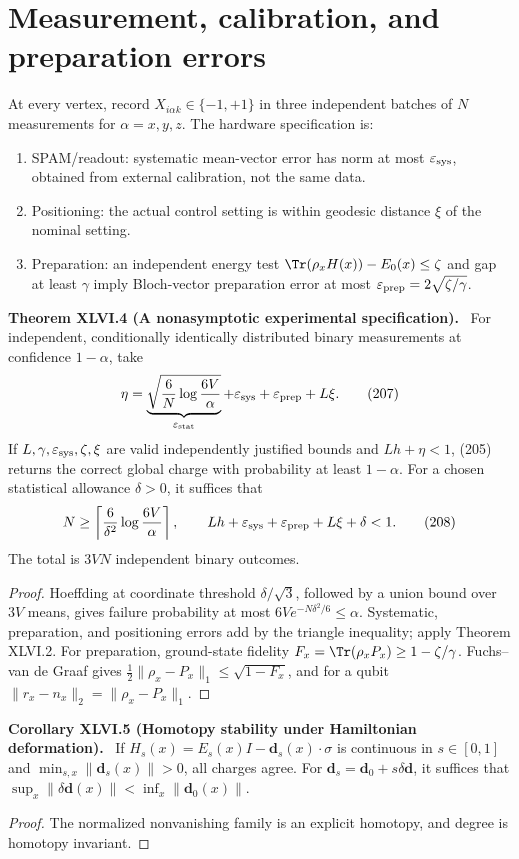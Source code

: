 \documentclass[11pt,a4paper,oneside]{book}
\newcommand{\statement}[3]{\par\medskip\noindent\textbf{#1 #2 (#3).}\ }
\begin{document}
\section{Measurement, calibration, and preparation errors}
At every vertex, record $X_{i\alpha k}\in\{-1,+1\}$ in three independent batches of $N$ measurements for $\alpha=x,y,z$. The hardware specification is:
\begin{enumerate}
\item SPAM/readout: systematic mean-vector error has norm at most $\varepsilon_{\rm sys}$, obtained from external calibration, not the same data.
\item Positioning: the actual control setting is within geodesic distance $\xi$ of the nominal setting.
\item Preparation: an independent energy test $\Tr(\rho_xH(x))-E_0(x)\le\zeta$ and gap at least $\gamma$ imply Bloch-vector preparation error at most $\varepsilon_{\rm prep}=2\sqrt{\zeta/\gamma}$.
\end{enumerate}
\statement{Theorem}{XLVI.4}{A nonasymptotic experimental specification}
For independent, conditionally identically distributed binary measurements at confidence $1-\alpha$, take
\begin{equation}\eta=\underbrace{\sqrt{\frac6N\log\frac{6V}{\alpha}}}_{\varepsilon_{\rm stat}}+\varepsilon_{\rm sys}+\varepsilon_{\rm prep}+L\xi.\tag{207}\end{equation}
If $L,\gamma,\varepsilon_{\rm sys},\zeta,\xi$ are valid independently justified bounds and $Lh+\eta<1$, (205) returns the correct global charge with probability at least $1-\alpha$. For a chosen statistical allowance $\delta>0$, it suffices that
\begin{equation}N\ge\left\lceil\frac6{\delta^2}\log\frac{6V}{\alpha}\right\rceil,\qquad Lh+\varepsilon_{\rm sys}+\varepsilon_{\rm prep}+L\xi+\delta<1.\tag{208}\end{equation}
The total is $3VN$ independent binary outcomes.
\begin{proof}
Hoeffding at coordinate threshold $\delta/\sqrt3$, followed by a union bound over $3V$ means, gives failure probability at most $6Ve^{-N\delta^2/6}\le\alpha$. Systematic, preparation, and positioning errors add by the triangle inequality; apply Theorem XLVI.2. For preparation, ground-state fidelity $F_x=\Tr(\rho_xP_x)\ge1-\zeta/\gamma$. Fuchs--van de Graaf gives $\frac12\|\rho_x-P_x\|_1\le\sqrt{1-F_x}$, and for a qubit $\|r_x-n_x\|_2=\|\rho_x-P_x\|_1$.
\end{proof}
\statement{Corollary}{XLVI.5}{Homotopy stability under Hamiltonian deformation}
If $H_s(x)=E_s(x)I-\mathbf d_s(x)\cdot\sigma$ is continuous in $s\in[0,1]$ and $\min_{s,x}\|\mathbf d_s(x)\|>0$, all charges agree. For $\mathbf d_s=\mathbf d_0+s\delta\mathbf d$, it suffices that $\sup_x\|\delta\mathbf d(x)\|<\inf_x\|\mathbf d_0(x)\|$.
\begin{proof}
The normalized nonvanishing family is an explicit homotopy, and degree is homotopy invariant.
\end{proof}
\end{document}
